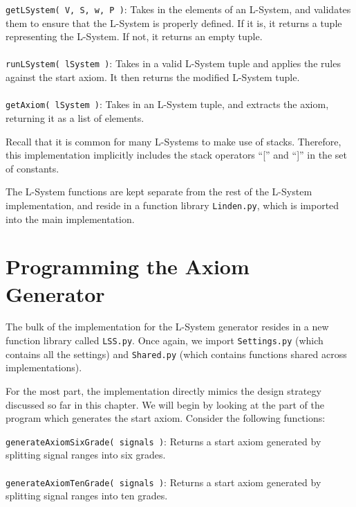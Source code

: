 \begin{singlespace}
\begin{formality}
\texttt{getLSystem( V, S, w, P )}: Takes in the elements of an L-System, and validates them to ensure that the L-System is properly defined. If it is, it returns a tuple representing the L-System. If not, it returns an empty tuple. \\\\
\texttt{runLSystem( lSystem )}: Takes in a valid L-System tuple and applies the rules against the start axiom. It then returns the modified L-System tuple.\\\\
\texttt{getAxiom( lSystem )}: Takes in an L-System tuple, and extracts the axiom, returning it as a list of elements.
\end{formality}
\end{singlespace}

Recall that it is common for many L-Systems to make use of stacks. Therefore, this implementation implicitly includes the stack operators ``['' and ``]'' in the set of constants.

The L-System functions are kept separate from the rest of the L-System implementation, and reside in a function library \texttt{Linden.py}, which is imported into the main implementation.

\section{Programming the Axiom Generator}
The bulk of the implementation for the L-System generator resides in a new function library called \texttt{LSS.py}. Once again, we import \texttt{Settings.py} (which contains all the settings) and \texttt{Shared.py} (which contains functions shared across implementations).

For the most part, the implementation directly mimics the design strategy discussed so far in this chapter. We will begin by looking at the part of the program which generates the start axiom. Consider the following functions:

\begin{singlespace}
\begin{formality}
\texttt{generateAxiomSixGrade( signals )}: Returns a start axiom generated by splitting signal ranges into six grades.\\\\
\texttt{generateAxiomTenGrade( signals )}: Returns a start axiom generated by splitting signal ranges into ten grades.
\end{formality}
\end{singlespace}

